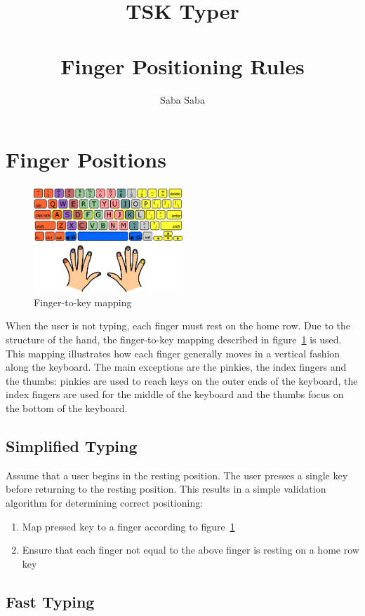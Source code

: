 \documentclass[12pt, letterpaper, titlepage]{article}
\author{Saba Saba}
\title{\textbf{TSK Typer} \\
\hrulefill \\
Finger Positioning Rules}
\begin{document}
\maketitle

\tableofcontents
\newpage
\listoffigures
\newpage

\section{Finger Positions}
\begin{figure}[h]
\centering
\includegraphics[width=0.5\textwidth]{which_fingers.png}
\caption{Finger-to-key mapping~\cite{hudson.misc}}
\label{Mapping}
\end{figure}
When the user is not typing, each finger must rest on the home row.
Due to the structure of the hand, the finger-to-key mapping described in figure~\ref{Mapping} is used.
This mapping illustrates how each finger generally moves in a vertical fashion along the keyboard.
The main exceptions are the pinkies, the index fingers and the thumbs:
pinkies are used to reach keys on the outer ends of the keyboard, the index fingers are used for the middle of the keyboard and the thumbs focus on the bottom of the keyboard.

\subsection{Simplified Typing}
Assume that a user begins in the resting position.
The user presses a single key before returning to the resting position.
This results in a simple validation algorithm for determining correct positioning:
\begin{enumerate}
\item Map pressed key to a finger according to figure~\ref{Mapping}
\item Ensure that each finger not equal to the above finger is resting on a home row key
\end{enumerate}

\subsection{Fast Typing}



\clearpage
{}
{}

\end{document}
